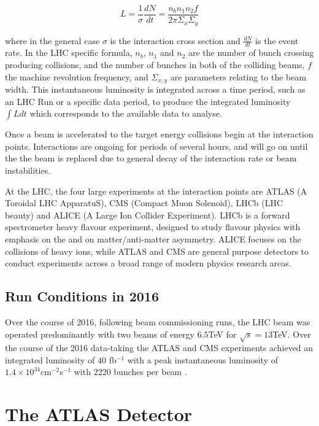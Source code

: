 	\begin{equation}
		L = \frac{1}{\sigma}\frac{dN}{dt} = \frac{n_bn_1n_2f}{2\pi\Sigma_x\Sigma_y}
	\end{equation}

	where in the general case $\sigma$ is the interaction cross section and $\frac{dN}{dt}$ is the event rate. In the LHC specific formula, $n_b$, $n_1$ and $n_2$ are the number of bunch crossing producing collisions, and the number of bunches in both of the colliding beams, $f$ the machine revolution frequency, and $\Sigma_{x, y}$ are parameters relating to the beam width. This instantaneous luminosity is integrated across a time period, such as an LHC Run or a specific data period, to produce the integrated luminosity $\int L dt$ which corresponds to the available data to analyse.

	Once a beam is accelerated to the target energy collisions begin at the interaction points. Interactions are ongoing for periods of several hours, and will go on until the the beam is replaced due to general decay of the interaction rate or beam instabilities.

	At the LHC, the four large experiments at the interaction points are ATLAS (A Toroidal LHC ApparatuS), CMS (Compact Muon Solenoid), LHCb (LHC beauty) and ALICE (A Large Ion Collider Experiment). LHCb is a forward spectrometer heavy flavour experiment, designed to study flavour physics with emphasis on the \bquark and on matter/anti-matter asymmetry. ALICE focuses on the collisions of heavy ions, while ATLAS and CMS are general purpose detectors to conduct experiments across a broad range of modern physics research areas.

	\subsection{Run Conditions in 2016}

	Over the course of 2016, following beam commissioning runs, the LHC beam was operated predominantly with two beams of energy $6.5$TeV for $\sqrt{s}=13$TeV. Over the course of the 2016 data-taking the ATLAS and CMS experiments achieved an integrated luminosity of $40$ fb$^{-1}$ with a peak instantaneous luminosity of $1.4\times10^{34}$cm$^{-2}$s$^{-1}$ with 2220 bunches per beam \cite{Run2016}.


\section{The ATLAS Detector}

